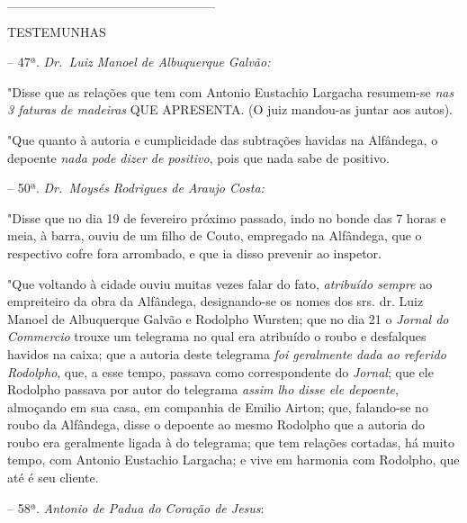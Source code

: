 \_\_\_\_\_\_\_\_\_\_\_\_\_\_\_\_\_\_\_\_\_\_

TESTEMUNHAS

-- 47ª. \emph{Dr.~Luiz Manoel de Albuquerque Galvão:}

"Disse que as relações que tem com Antonio Eustachio Largacha resumem-se
\emph{nas 3 faturas de madeiras} QUE APRESENTA. (O juiz mandou-as juntar
aos autos).

"Que quanto à autoria e cumplicidade das subtrações havidas na
Alfândega, o depoente \emph{nada pode dizer de positivo}, pois que nada
sabe de positivo.

-- 50ª. \emph{Dr.~Moysés Rodrigues de Araujo Costa:}

"Disse que no dia 19 de fevereiro próximo passado, indo no bonde das 7
horas e meia, à barra, ouviu de um filho de Couto, empregado na
Alfândega, que o respectivo cofre fora arrombado, e que ia disso
prevenir ao inspetor.

"Que voltando à cidade ouviu muitas vezes falar do fato, \emph{atribuído
sempre} ao empreiteiro da obra da Alfândega, designando-se os nomes dos
srs. dr. Luiz Manoel de Albuquerque Galvão e Rodolpho Wursten; que no
dia 21 o \emph{Jornal do Commercio} trouxe um telegrama no qual era
atribuído o roubo e desfalques havidos na caixa; que a autoria deste
telegrama \emph{foi geralmente dada ao referido Rodolpho}, que, a esse
tempo, passava como correspondente do \emph{Jornal}; que ele Rodolpho
passava por autor do telegrama \emph{assim lho disse ele depoente},
almoçando em sua casa, em companhia de Emilio Airton; que, falando-se no
roubo da Alfândega, disse o depoente ao mesmo Rodolpho que a autoria do
roubo era geralmente ligada à do telegrama; que tem relações cortadas,
há muito tempo, com Antonio Eustachio Largacha; e vive em harmonia com
Rodolpho, que até é seu cliente.

-- 58ª. \emph{Antonio de Padua do Coração de Jesus}:

